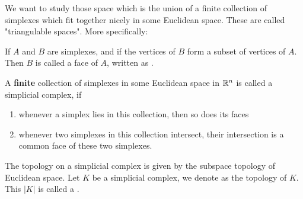 We want to study those space which is the union of a finite collection
of simplexes which fit together nicely in some Euclidean space. These
are called "triangulable spaces". More specifically:
\begin{defi}[faces]
    If $A$ and $B$ are simplexes, and if the vertices of $B$ form a
    subset of vertices of $A$. Then $B$ is called a face of $A$,
    written as .
\end{defi}
\begin{defi}
    A \textbf{finite} collection of simplexes in some Euclidean space
    in $\mathbb{R}^n$ is called a simplicial complex, if
    \begin{enumerate}
        \item whenever a simplex lies in this collection, then so does
            its faces
        \item whenever two simplexes in this collection intersect,
            their intersection is a common face of these two
            simplexes.
    \end{enumerate}
\end{defi}
\begin{ex}
\end{ex}
\begin{defi}
    The topology on a simplicial complex is given by the subspace
    topology of Euclidean space. Let $K$ be a simplicial complex, we
    denote  as the topology of $K$. This $|K|$ is called
    a .
\end{defi}

